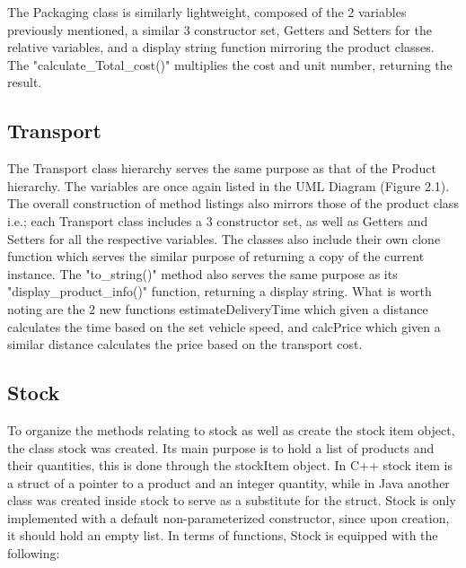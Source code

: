 \documentclass[12pt, a4paper]{report}
\begin{document}
The Packaging class is similarly lightweight, composed of the 2 variables previously mentioned, a similar 3 constructor set, Getters and Setters for the relative variables, and a display string function mirroring the product classes. The "calculate\_Total\_cost()" multiplies the cost and unit number, returning the result.

\subsection{Transport}
The Transport class hierarchy serves the same purpose as that of the Product hierarchy. The variables are once again listed in the UML Diagram (Figure 2.1). The overall construction of method listings also mirrors those of the product class i.e.; each Transport class includes a 3 constructor set, as well as Getters and Setters for all the respective variables. The classes also include their own clone function which serves the similar purpose of returning a copy of the current instance. The "to\_string()" method also serves the same purpose as its "display\_product\_info()" function, returning a display string. What is worth noting are the 2 new functions estimateDeliveryTime which given a distance calculates the time based on the set vehicle speed, and calcPrice which given a similar distance calculates the price based on the transport cost.

\subsection{Stock}
To organize the methods relating to stock as well as create the stock item object, the class stock was created. Its main purpose is to hold a list of products and their quantities, this is done through the stockItem object. In C++ stock item is a struct of a pointer to a product and an integer quantity, while in Java another class was created inside stock to serve as a substitute for the struct. Stock is only implemented with a default non-parameterized constructor, since upon creation, it should hold an empty list. In terms of functions, Stock is equipped with the following:\\
\end{document}
